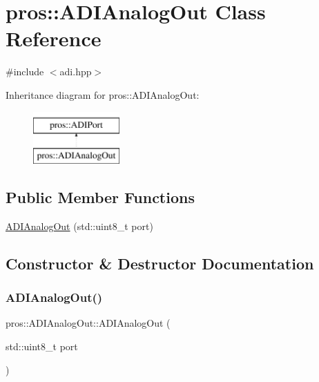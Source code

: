 \hypertarget{classpros_1_1ADIAnalogOut}{}\section{pros\+:\+:A\+D\+I\+Analog\+Out Class Reference}
\label{classpros_1_1ADIAnalogOut}


{\ttfamily \#include $<$adi.\+hpp$>$}

Inheritance diagram for pros\+:\+:A\+D\+I\+Analog\+Out\+:\begin{figure}[H]
\begin{center}
\leavevmode
\includegraphics[height=2.000000cm]{classpros_1_1ADIAnalogOut}
\end{center}
\end{figure}
\subsection*{Public Member Functions}
\begin{DoxyCompactItemize}
\item 
\hyperlink{classpros_1_1ADIAnalogOut_a1758096961a060dea379bd696c293d26}{A\+D\+I\+Analog\+Out} (std\+::uint8\+\_\+t port)
\end{DoxyCompactItemize}


\subsection{Constructor \& Destructor Documentation}
\mbox{\label{classpros_1_1ADIAnalogOut_a1758096961a060dea379bd696c293d26}} 
\subsubsection{\texorpdfstring{A\+D\+I\+Analog\+Out()}{ADIAnalogOut()}}
{\footnotesize\ttfamily pros\+::\+A\+D\+I\+Analog\+Out\+::\+A\+D\+I\+Analog\+Out (\begin{DoxyParamCaption}\item[{std\+::uint8\+\_\+t}]{port }\end{DoxyParamCaption})}

